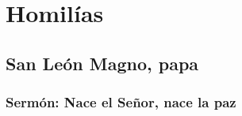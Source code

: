 	\section{Homilías}
		\homiliasNavidad

		\subsection{San León Magno, papa}
		
			\subsubsection{Sermón: Nace el Señor, nace la paz}
			
				
